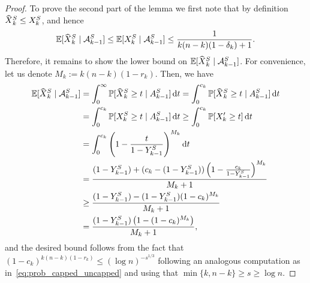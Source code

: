 \documentclass[a4paper,11pt]{article}
\theoremstyle{definition}
\theoremstyle{plain}
\newcommand{\A}{\mathcal A}
\newcommand{\prob}{\mathbb{P}}
\newcommand{\expect}{\mathbb{E}}
\newcommand{\capped}[1]{\hstretch{2}{\hat{\hstretch{.5}{#1}}}}
\DeclareMathOperator{\dd}{d\!} %
\begin{document}
\begin{proof}
  To prove the second part of the lemma we first note that by definition $\capped{X}_k^{S} \leq X_k^{S}$, and hence
  \[
    \expect[ \capped{X}_k^{S} \mid \A_{k-1}^{S} ]
    \leq
    \expect[ X_k^{S} \mid \A_{k-1}^{S} ]
    \leq
    \frac{1}{k(n-k)(1-\delta_k) + 1}.
  \]
    Therefore, it remains to show the lower bound on $\expect[ \capped{X}_k^{S} \mid \A_{k-1}^{S} ]$. For convenience, let us denote $M_k := k(n-k)(1-r_k)$.
  Then, we have
  \begin{equation*}
  \begin{split}
    \expect[ \capped{X}_k^{S} \mid \A_{k-1}^{S} ]
    &=
    \int_{0}^{\infty} \prob[\capped{X}_k^{S} \geq t \mid A_{k-1}^{S}] \dd t
    =
    \int_{0}^{c_k} \prob[\capped{X}_k^{S} \geq t \mid A_{k-1}^{S}] \dd t
    \\ &=
    \int_{0}^{c_k} \prob[X_k^{S} \geq t \mid A_{k-1}^{S}] \dd t
    \geq
    \int_{0}^{c_k} \prob[X_k' \geq t] \dd t
    \\ &=
    \int_{0}^{c_k} \left( 1 - \frac{t}{1 - Y_{k-1}^{S}} \right)^{M_k} \dd t
    \\ &=
    \frac{(1 - Y_{k-1}^{S}) + (c_k - (1 - Y_{k-1}^{S})) \left( 1 - \frac{c_k}{1 - Y_{k-1}^{S}} \right)^{M_k}}{M_k + 1}
    \\ & \geq
    \frac{(1 - Y_{k-1}^{S}) - (1 - Y_{k-1}^{S}) ( 1 - c_k )^{M_k}}{M_k + 1}
    \\ & =
    \frac{(1 - Y_{k-1}^{S}) \left( 1 - ( 1 - c_k )^{M_k} \right)}{M_k + 1},
  \end{split}
  \end{equation*}
    and the desired bound follows from the fact that
   $(1 - c_k)^{ k(n- k)(1-r_k)}  \leq (\log n)^{-s^{1/3}}$ following an analogous computation as in~\cref{eq:prob_capped_uncapped} and using that $\min\{k, n-k\}\ge s\ge \log n$.
\end{proof}
\end{document}
